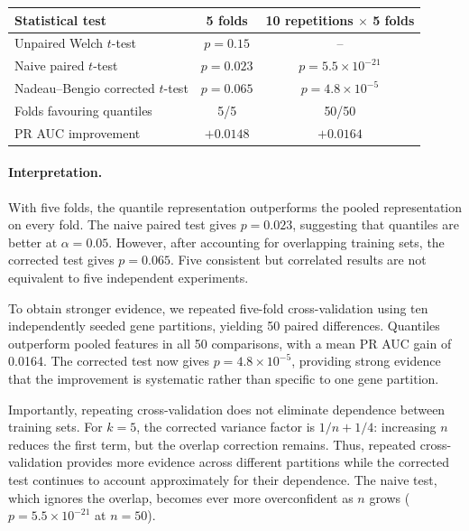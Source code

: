 \documentclass[11pt,a4paper]{article}
\begin{document}
\begin{center}
\small
\begin{tabular}{lcc}
    \toprule
    \textbf{Statistical test}
    & \textbf{5 folds}
    & \textbf{10 repetitions $\times$ 5 folds} \\
    \midrule
    Unpaired Welch $t$-test
    & $p=0.15$ & -- \\
    Naive paired $t$-test
    & $p=0.023$ & $p=5.5\times10^{-21}$ \\
    Nadeau--Bengio corrected $t$-test
    & $p=0.065$ & $p=4.8\times10^{-5}$ \\
    \midrule
    Folds favouring quantiles
    & 5/5 & 50/50 \\
    PR AUC improvement
    & $+0.0148$ & $+0.0164$ \\
    \bottomrule
\end{tabular}
\end{center}

\paragraph{Interpretation.}
With five folds, the quantile representation outperforms the pooled representation on every fold. The naive paired test gives $p=0.023$, suggesting that quantiles are better at $\alpha=0.05$. However, after accounting for overlapping training sets, the corrected test gives $p=0.065$. Five consistent but correlated results are not equivalent to five independent experiments.

To obtain stronger evidence, we repeated five-fold cross-validation using ten independently seeded gene partitions, yielding 50 paired differences. Quantiles outperform pooled features in all 50 comparisons, with a mean PR AUC gain of 0.0164. The corrected test now gives $p=4.8\times10^{-5}$, providing strong evidence that the improvement is systematic rather than specific to one gene partition.

Importantly, repeating cross-validation does not eliminate dependence between training sets. For $k=5$, the corrected variance factor is $1/n+1/4$: increasing $n$ reduces the first term, but the overlap correction remains. Thus, repeated cross-validation provides more evidence across different partitions while the corrected test continues to account approximately for their dependence. The naive test, which ignores the overlap, becomes ever more overconfident as $n$ grows ($p=5.5\times10^{-21}$ at $n=50$).
\end{document}
